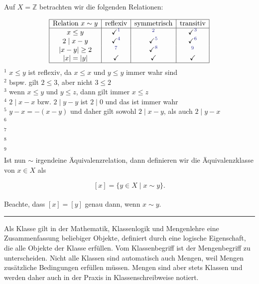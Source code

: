 \documentclass[9pt]{article}
\begin{document}
\begin{bsp}
 Auf \( X = \mathbb{Z} \) betrachten wir die folgenden Relationen:

\[
\begin{array}{|c|c|c|c|}
\hline
\text{Relation } x \sim y & \text{reflexiv} & \text{symmetrisch} & \text{transitiv} \\
\hline
x \leq y & \checkmark^{\txc{1}} & ^{\txc{2}}& \checkmark^{\txc{3}}   \\
2 \mid x - y & \checkmark^{\txc{4}} & \checkmark^{\txc{5}} & \checkmark^{\txc{6}} \\
|x - y| \geq 2 & ^{\txc{7}} & \checkmark^{\txc{8}} & ^{\txc{9}}  \\
|x| = |y| & \checkmark & \checkmark & \checkmark \\
\hline
\end{array}
\]
\color{Blue}
\textbf{$^{1}$} $x \leq y$ ist reflexiv, da  $x \leq x$ und $y \leq y$ immer wahr sind \\
\textbf{$^{2}$} bspw. gilt $2 \leq 3$, aber nicht $3 \leq 2$ \\
\textbf{$^{3}$} wenn $x \leq y$ und $y \leq z$, dann gilt immer $x \leq z$  \\
\textbf{$^{4}$} $2 \mid x - x$ bzw. $2 \mid y - y$ ist $2 \mid 0$ und das ist immer wahr \\
\textbf{$^{5}$} $y-x=-(x-y)$ und daher gilt sowohl $2 \mid x - y$, als auch $2 \mid y - x$ \\
\textbf{$^{6}$}  \\
\textbf{$^{7}$}  \\
\textbf{$^{8}$}  \\
\textbf{$^{9}$}  \\
\color{black}
Ist nun \( \sim \) irgendeine Äquivalenzrelation, dann definieren wir die Äquivalenzklasse von \( x \in X \) als

\[
[x] = \{ y \in X \mid x \sim y \}.
\]
\\ 
Beachte, dass \( [x] = [y] \) genau dann, wenn \( x \sim y \).
\end{bsp} \noindent \rule{8cm}{0.4pt}
\color{Blue}
\begin{info}
\color{Blue}
Als Klasse gilt in der Mathematik, Klassenlogik und Mengenlehre eine Zusammenfassung beliebiger Objekte, definiert durch eine logische Eigenschaft, die alle Objekte der Klasse erfüllen. Vom Klassenbegriff ist der Mengenbegriff zu unterscheiden. Nicht alle Klassen sind automatisch auch Mengen, weil Mengen zusätzliche Bedingungen erfüllen müssen. Mengen sind aber stets Klassen und werden daher auch in der Praxis in Klassenschreibweise notiert. 
\end{info}
\color{black}
\end{document}
